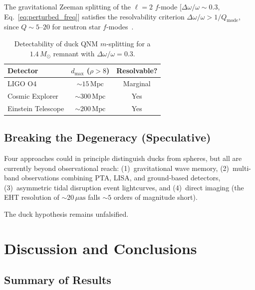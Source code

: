 \documentclass[aps,prd,twocolumn,superscriptaddress,nofootinbib]{revtex4-2}
\newcommand{\Msun}{M_\odot}
\begin{document}
The gravitational Zeeman splitting of the $\ell = 2$ $f$-mode
[$\Delta\omega/\omega \sim 0.3$, Eq.~\eqref{eq:perturbed_freq}] satisfies
the resolvability criterion
$\Delta\omega/\omega > 1/Q_{\mathrm{mode}}$, since $Q \sim 5$--$20$ for
neutron star $f$-modes~\cite{KokkotasSchmidt1999, AnderssonKokkotas1998}.

\begin{table}[!htb]
\caption{Detectability of duck QNM $m$-splitting for a $1.4\,\Msun$
remnant with $\Delta\omega/\omega = 0.3$.}
\label{tab:detectability}
\begin{ruledtabular}
\begin{tabular}{lcc}
Detector & $d_{\max}$ ($\rho > 8$) & Resolvable? \\
\hline
LIGO O4 & $\sim 15\,\mathrm{Mpc}$ & Marginal \\
Cosmic Explorer & $\sim 300\,\mathrm{Mpc}$ & Yes \\
Einstein Telescope & $\sim 200\,\mathrm{Mpc}$ & Yes \\
\end{tabular}
\end{ruledtabular}
\end{table}


\subsection{Breaking the Degeneracy (Speculative)}
\label{sec:breaking}

Four approaches could in principle distinguish ducks from spheres, but all
are currently beyond observational reach:
(1)~gravitational wave memory,
(2)~multi-band observations combining PTA, LISA, and ground-based detectors,
(3)~asymmetric tidal disruption event lightcurves, and
(4)~direct imaging (the EHT resolution of $\sim 20\,\mu\mathrm{as}$ falls
$\sim 5$ orders of magnitude short).

The duck hypothesis remains unfalsified.


\section{Discussion and Conclusions}
\label{sec:discussion}

\subsection{Summary of Results}
\end{document}
